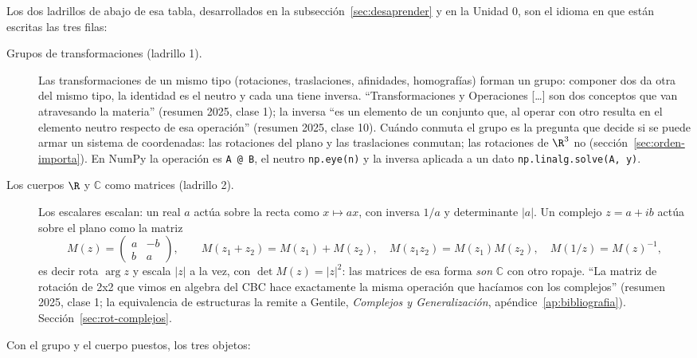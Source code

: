 Los dos ladrillos de abajo de esa tabla, desarrollados en la subsección~\ref{sec:desaprender}
y en la Unidad 0, son el idioma en que están escritas las tres filas:

\begin{description}
  \item[Grupos de transformaciones (ladrillo 1).] Las transformaciones de un mismo tipo
  (rotaciones, traslaciones, afinidades, homografías) forman un grupo: componer dos da otra
  del mismo tipo, la identidad es el neutro y cada una tiene inversa. ``Transformaciones y
  Operaciones [\ldots] son dos conceptos que van atravesando la materia'' (resumen 2025,
  clase 1); la inversa ``es un elemento de un conjunto que, al operar con otro resulta en el
  elemento neutro respecto de esa operación'' (resumen 2025, clase 10). Cuándo conmuta el
  grupo es la pregunta que decide si se puede armar un sistema de coordenadas: las
  rotaciones del plano y las traslaciones conmutan; las rotaciones de \(\R^3\) no
  (sección~\ref{sec:orden-importa}). En NumPy la operación es \texttt{A @ B}, el neutro
  \texttt{np.eye(n)} y la inversa aplicada a un dato \texttt{np.linalg.solve(A, y)}.
  \item[Los cuerpos \(\R\) y \(\mathbb{C}\) como matrices (ladrillo 2).] Los escalares
  escalan: un real \(a\) actúa sobre la recta como \(x\mapsto ax\), con inversa \(1/a\) y
  determinante \(|a|\). Un complejo \(z=a+ib\) actúa sobre el plano como la matriz
  \[
    M(z)=\begin{pmatrix}a&-b\\ b&a\end{pmatrix},\qquad
    M(z_1+z_2)=M(z_1)+M(z_2),\quad M(z_1z_2)=M(z_1)M(z_2),\quad M(1/z)=M(z)^{-1},
  \]
  es decir rota \(\arg z\) y escala \(|z|\) a la vez, con \(\det M(z)=|z|^2\): las matrices
  de esa forma \emph{son} \(\mathbb{C}\) con otro ropaje. ``La matriz de rotación de 2x2 que
  vimos en algebra del CBC hace exactamente la misma operación que hacíamos con los
  complejos'' (resumen 2025, clase 1; la equivalencia de estructuras la remite a Gentile,
  \emph{Complejos y Generalización}, apéndice~\ref{ap:bibliografia}). Sección~\ref{sec:rot-complejos}.
\end{description}

Con el grupo y el cuerpo puestos, los tres objetos:

